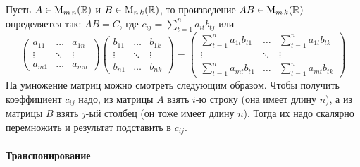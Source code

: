 Пусть $A\in\operatorname{M}_{m\,n}(\mathbb R)$ и $B\in\operatorname{M}_{n\,k}(\mathbb R)$, то произведение $AB\in\operatorname{M}_{m\,k}(\mathbb R)$ определяется так: $AB = C$, где $c_{ij} = \sum_{t=1}^n a_{it}b_{tj}$ или
\[
\begin{pmatrix}
a_{11}&\ldots& a_{1n}\\
\vdots&\ddots&\vdots\\
a_{m1}& \ldots &a_{mn}
\end{pmatrix}
\begin{pmatrix}
b_{11}&\ldots& b_{1k}\\
\vdots&\ddots&\vdots\\
b_{n1}& \ldots &b_{nk}
\end{pmatrix}
=\begin{pmatrix}
\sum_{t=1}^n a_{1t}b_{t1}&\ldots& \sum_{t=1}^n a_{1t}b_{tk}\\
\vdots&\ddots&\vdots\\
\sum_{t=1}^n a_{mt}b_{t1}& \ldots &\sum_{t=1}^n a_{mt}b_{tk}
\end{pmatrix}
\]
На умножение матриц можно смотреть следующим образом.
Чтобы получить коэффициент $c_{ij}$ надо, из матрицы $A$ взять $i$-ю строку (она имеет длину $n$), а из матрицы $B$ взять $j$-ый столбец (он тоже имеет длину $n$).
Тогда их надо скалярно перемножить и результат подставить в $c_{ij}$.

\paragraph{Транспонирование}

